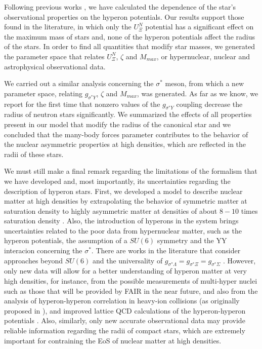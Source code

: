 \documentclass[twocolumn,showpacs,aps]{revtex4}
\begin{document}
Following previous works \cite{Weissenborn:2011kb,Bhowmick:2014pma}, we have calculated the dependence of the star's observational properties
on the hyperon potentials. Our results support those found in the literature, in which only the $U_{\Xi}^{N}$
potential has a significant effect on the maximum mass of stars and, none of the hyperon potentials affect the radius of the stars.
In order to find all quantities that modify star masses, we generated the 
parameter space that relates $U_{\Xi}^{N}$, $\zeta$ and $M_{max}$, or hypernuclear, nuclear and astrophysical observational data.

We carried out a similar analysis concerning the $\sigma^*$ meson, from which a new parameter space, 
relating $g_{\sigma^* Y}$, $\zeta$ and $M_{max}$, was generated.
As far as we know, we report for the first time that nonzero values of the $g_{\sigma^* Y}$ coupling
decrease the radius of neutron stars significantly. 
We summarized the effects of all properties present in our model that modify the radius of the canonical star 
and we concluded that the many-body forces parameter contributes to the behavior of the nuclear asymmetric properties at high densities,
which are reflected in the radii of these stars.


We must still make a final remark regarding the limitations of the formalism that we have developed and, 
most importantly, its uncertainties regarding the description of hyperon stars.
First, we developed a model to describe nuclear matter at high densities by extrapolating the
behavior of symmetric matter at saturation density to highly asymmetric matter at densities 
of about $8-10$ times saturation density \cite{Schaffner:1995th}.
Also, the introduction of hyperons in the system brings uncertainties related to the 
poor data from hypernuclear matter, such as the hyperon potentials, the assumption of a $SU(6)$ 
symmetry and the YY interacion concerning the $\sigma^*$\cite{Fortin:2014mya}. 
There are works in the literature that consider approaches beyond $SU(6)$ \cite{Mi:2007zz,Weissenborn:2011ut,Lopes:2013cpa}
and the universality of $g_{\sigma^* \Lambda}=g_{\sigma^* \Xi}=g_{\sigma^* \Sigma}$ \cite{SchaffnerBielich:2000wj,Mi:2010zz,Gusakov:2014ota}.
However, only new data will allow for a better understanding of hyperon matter at very high densities, 
for instance, from the possible measurements of multi-hyper nuclei such as those that will be provided by FAIR in the near future,
and also from the analysis of hyperon-hyperon correlation in heavy-ion collisions (as originally proposed in \cite{Greiner:1989ig}),
and improved lattice QCD calculations of the hyperon-hyperon potentials \cite{Inoue:2010hs}.
Also, similarly, only new accurate observational data may provide
reliable information regarding the radii of compact stars, which are extremely 
important for contraining the EoS of nuclear matter at high densities.
\end{document}

